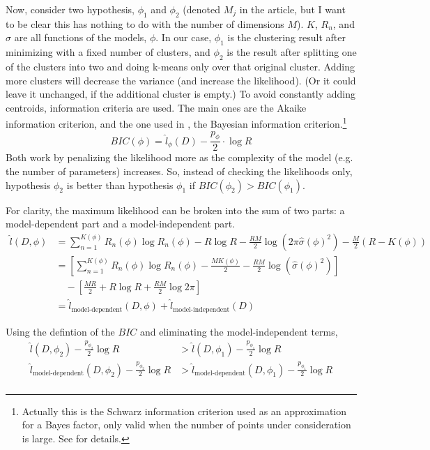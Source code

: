 \documentclass[letterpaper]{article}
\begin{document}
Now, consider two hypothesis, $\phi_1$ and $\phi_2$ (denoted $M_j$ in
the article, but I want to be clear this has nothing to do with the
number of dimensions $M$).  $K$, $R_n$, and $\sigma$ are all functions
of the models, $\phi$.  In our case, $\phi_1$ is the clustering result
after minimizing with a fixed number of clusters, and $\phi_2$ is the
result after splitting one of the clusters into two and doing k-means
only over that original cluster.  Adding more clusters will decrease
the variance (and increase the likelihood).  (Or it could leave it
unchanged, if the additional cluster is empty.)  To avoid constantly
adding centroids, information criteria are used.  The main ones are
the Akaike information criterion, and the one used in
\cite{Pelleg2000}, the Bayesian information
criterion.\footnote{Actually this is the Schwarz information criterion
  used as an approximation for a Bayes factor, only valid when the
  number of points under consideration is large.  See \cite{Kass1995}
  for details.}
\begin{equation}
  \label{eq:22}
  BIC(\phi) = \hat{l}_\phi(D) - \frac{p_{\phi}}{2} \cdot \log R
\end{equation}
  Both work by penalizing the likelihood more as the
complexity of the model (e.g. the number of parameters) increases.
So, instead of checking the likelihoods only, hypothesis $\phi_2$ is
better than hypothesis $\phi_1$ if $BIC(\phi_2) > BIC(\phi_1)$.

For clarity, the maximum likelihood can be broken into the sum of two
parts: a model-dependent part and a model-independent part.
\begin{align}
  \label{eq:16}
  \hat{l}(D, \phi) &= \sum_{n=1}^{K(\phi)} R_n(\phi) \log R_n(\phi) - R \log R - \frac{RM}{2} \log \left(2 \pi \hat{\sigma}(\phi)^2 \right)
                   - \frac{M}{2} \left( R - K(\phi) \right) \\
                   &= \left[ \sum_{n=1}^{K(\phi)} R_n(\phi) \log R_n(\phi) - \frac{M K(\phi)}{2} - \frac{RM}{2} \log \left( \hat{\sigma}(\phi)^2 \right) \right] \nonumber \\
                   & \quad - \left[ \frac{M R}{2} + R \log R + \frac{RM}{2} \log 2 \pi \right] \\
                   &= \hat{l}_{\text{model-dependent}}(D, \phi) + \hat{l}_{\text{model-independent}}(D)
\end{align}

Using the defintion of the $BIC$ and eliminating the model-independent terms,
\begin{align}
  \hat{l}(D, \phi_2) - \frac{p_{\phi_2}}{2} \log R &> \hat{l}(D, \phi_1) - \frac{p_{\phi_1}}{2} \log R \nonumber \\
  \label{eq:17}
  \hat{l}_{\text{model-dependent}}(D, \phi_2) - \frac{p_{\phi_2}}{2} \log R &> \hat{l}_{\text{model-dependent}}(D, \phi_1) - \frac{p_{\phi_1}}{2} \log R \nonumber \\
\end{align}
\end{document}

